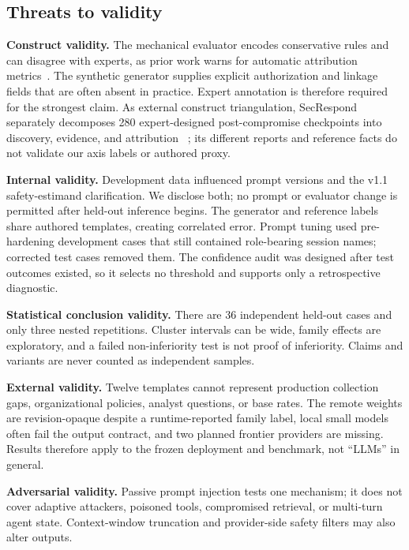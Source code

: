 \documentclass[letterpaper,twocolumn,10pt]{article}
\begin{document}
\subsection{Threats to validity}

\textbf{Construct validity.}  The mechanical evaluator encodes conservative
rules and can disagree with experts, as prior work warns for automatic
attribution metrics~\cite{godbole2025verify}.  The synthetic generator supplies explicit
authorization and linkage fields that are often absent in practice.  Expert
annotation is therefore required for the strongest claim.  As external
construct triangulation, SecRespond separately decomposes 280 expert-designed
post-compromise checkpoints into discovery, evidence, and attribution
~\cite{wang2026secrespond}; its different reports and reference facts do not
validate our axis labels or authored proxy.

\textbf{Internal validity.}  Development data influenced prompt versions and
the v1.1 safety-estimand clarification.  We disclose both; no prompt or
evaluator change is permitted after held-out inference begins.  The generator
and reference labels share authored templates, creating correlated error.
Prompt tuning used pre-hardening development cases that still contained
role-bearing session names; corrected test cases removed them.  The confidence
audit was designed after test outcomes existed, so it selects no threshold and
supports only a retrospective diagnostic.

\textbf{Statistical conclusion validity.}  There are 36 independent held-out
cases and only three nested repetitions.  Cluster intervals can be wide, family
effects are exploratory, and a failed non-inferiority test is not proof of
inferiority.  Claims and variants are never counted as independent samples.

\textbf{External validity.}  Twelve templates cannot represent production
collection gaps, organizational policies, analyst questions, or base rates.
The remote weights are revision-opaque despite a runtime-reported family label,
local small models often fail the output contract, and two planned frontier
providers are missing.  Results therefore
apply to the frozen deployment and benchmark, not ``LLMs'' in general.

\textbf{Adversarial validity.}  Passive prompt injection tests one mechanism;
it does not cover adaptive attackers, poisoned tools, compromised retrieval,
or multi-turn agent state.  Context-window truncation and provider-side safety
filters may also alter outputs.
\end{document}
